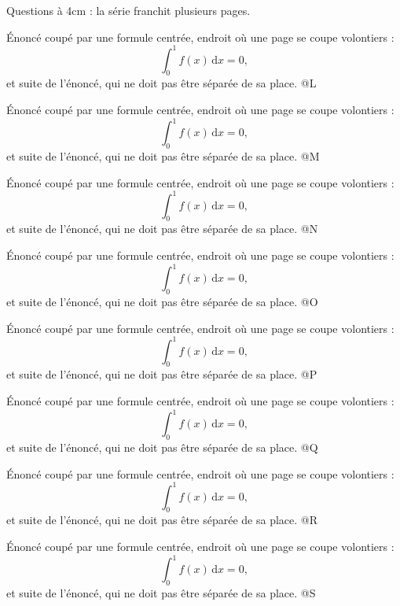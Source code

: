 \begin{exercise}[answerspace=4cm]
    Questions à 4cm : la série franchit plusieurs pages.
    \begin{question}
        [L] Énoncé coupé par une formule centrée, endroit où une page se coupe volontiers :
        \[
            \int_0^1 f(x) \, \mathrm{d}x = 0,
        \]
        et suite de l'énoncé, qui ne doit pas être séparée de sa place. @L
    \end{question}
    \begin{question}
        [M] Énoncé coupé par une formule centrée, endroit où une page se coupe volontiers :
        \[
            \int_0^1 f(x) \, \mathrm{d}x = 0,
        \]
        et suite de l'énoncé, qui ne doit pas être séparée de sa place. @M
    \end{question}
    \begin{question}
        [N] Énoncé coupé par une formule centrée, endroit où une page se coupe volontiers :
        \[
            \int_0^1 f(x) \, \mathrm{d}x = 0,
        \]
        et suite de l'énoncé, qui ne doit pas être séparée de sa place. @N
    \end{question}
    \begin{question}
        [O] Énoncé coupé par une formule centrée, endroit où une page se coupe volontiers :
        \[
            \int_0^1 f(x) \, \mathrm{d}x = 0,
        \]
        et suite de l'énoncé, qui ne doit pas être séparée de sa place. @O
    \end{question}
    \begin{question}
        [P] Énoncé coupé par une formule centrée, endroit où une page se coupe volontiers :
        \[
            \int_0^1 f(x) \, \mathrm{d}x = 0,
        \]
        et suite de l'énoncé, qui ne doit pas être séparée de sa place. @P
    \end{question}
    \begin{question}
        [Q] Énoncé coupé par une formule centrée, endroit où une page se coupe volontiers :
        \[
            \int_0^1 f(x) \, \mathrm{d}x = 0,
        \]
        et suite de l'énoncé, qui ne doit pas être séparée de sa place. @Q
    \end{question}
    \begin{question}
        [R] Énoncé coupé par une formule centrée, endroit où une page se coupe volontiers :
        \[
            \int_0^1 f(x) \, \mathrm{d}x = 0,
        \]
        et suite de l'énoncé, qui ne doit pas être séparée de sa place. @R
    \end{question}
    \begin{question}
        [S] Énoncé coupé par une formule centrée, endroit où une page se coupe volontiers :
        \[
            \int_0^1 f(x) \, \mathrm{d}x = 0,
        \]
        et suite de l'énoncé, qui ne doit pas être séparée de sa place. @S
    \end{question}
\end{exercise}
\setanswerspace{0pt}
